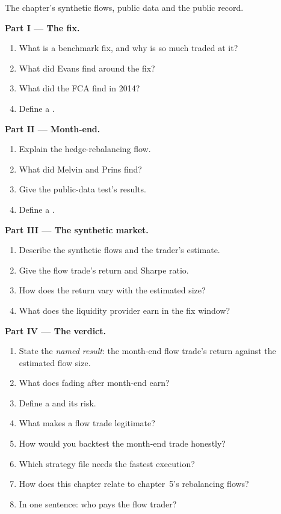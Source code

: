 \begin{problem}\label{pb:s2:fx-flow-strategies:1}
The chapter's synthetic flows, public data and the public record.

\medskip\noindent\textbf{Part I --- The fix.}
\begin{enumerate}
\item What is a benchmark fix, and why is so much traded at it?
\item What did Evans find around the fix?
\item What did the FCA find in 2014?
\item Define a .
\end{enumerate}

\medskip\noindent\textbf{Part II --- Month-end.}
\begin{enumerate}[resume]
\item Explain the hedge-rebalancing flow.
\item What did Melvin and Prins find?
\item Give the public-data test's results.
\item Define a .
\end{enumerate}

\medskip\noindent\textbf{Part III --- The synthetic market.}
\begin{enumerate}[resume]
\item Describe the synthetic flows and the trader's estimate.
\item Give the flow trade's return and Sharpe ratio.
\item How does the return vary with the estimated size?
\item What does the liquidity provider earn in the fix window?
\end{enumerate}

\medskip\noindent\textbf{Part IV --- The verdict.}
\begin{enumerate}[resume]
\item State the \emph{named result}: the month-end flow trade's return against the estimated flow size.
\item What does fading after month-end earn?
\item Define a  and its risk.
\item What makes a flow trade legitimate?
\item How would you backtest the month-end trade honestly?
\item Which strategy file needs the fastest execution?
\item How does this chapter relate to chapter~5's rebalancing flows?
\item In one sentence: who pays the flow trader?
\end{enumerate}
\end{problem}

